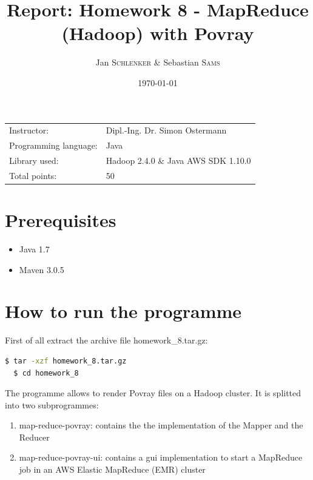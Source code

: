 \documentclass{article}
\title{Report: Homework 8 - MapReduce (Hadoop) with Povray}%
\author{Jan \textsc{Schlenker} \& Sebastian \textsc{Sams}} %
\date{\today} %
\begin{document}
\maketitle %

\begin{center}
\begin{tabular}{l l}
Instructor: & Dipl.-Ing. Dr. Simon Ostermann \\
Programming language: & Java \\
Library used: & Hadoop 2.4.0 \& Java AWS SDK 1.10.0 \\
Total points: & 50 \\
\end{tabular}
\end{center}



\section{Prerequisites}

\begin{itemize}
\item Java 1.7
\item Maven 3.0.5
\end{itemize}

\section{How to run the programme}

First of all extract the archive file homework\_8.tar.gz:

\begin{lstlisting}[language=bash, deletekeywords={cd}]
  $ tar -xzf homework_8.tar.gz
  $ cd homework_8
\end{lstlisting}

The programme allows to render Povray files on a Hadoop cluster.
It is splitted into two subprogrammes:

\begin{enumerate}
\item map-reduce-povray: contains the the implementation of the Mapper and the Reducer
\item map-reduce-povray-ui: contains a gui implementation to start a MapReduce job in an AWS Elastic MapReduce (EMR) cluster
\end{enumerate}
\end{document}
